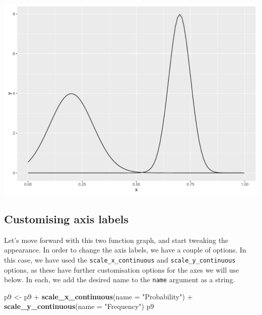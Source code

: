 \documentclass[]{article}
\newenvironment{Shaded}{\begin{snugshade}}{\end{snugshade}}
\newcommand{\KeywordTok}[1]{\textcolor[rgb]{0.13,0.29,0.53}{\textbf{{#1}}}}
\newcommand{\DataTypeTok}[1]{\textcolor[rgb]{0.13,0.29,0.53}{{#1}}}
\newcommand{\StringTok}[1]{\textcolor[rgb]{0.31,0.60,0.02}{{#1}}}
\newcommand{\NormalTok}[1]{{#1}}
\begin{document}
\begin{center}\includegraphics{0_all_posts_pdf/function_4-1} \end{center}

\subsection{Customising axis labels}\label{customising-axis-labels-2}

Let's move forward with this two function graph, and start tweaking the
appearance. In order to change the axis labels, we have a couple of
options. In this case, we have used the \texttt{scale\_x\_continuous}
and \texttt{scale\_y\_continuous} options, as these have further
customisation options for the axes we will use below. In each, we add
the desired name to the \texttt{name} argument as a string.

\begin{Shaded}
\begin{Highlighting}[]
\NormalTok{p9 <-}\StringTok{ }\NormalTok{p9 +}\StringTok{ }\KeywordTok{scale_x_continuous}\NormalTok{(}\DataTypeTok{name =} \StringTok{"Probability"}\NormalTok{) +}
\StringTok{      }\KeywordTok{scale_y_continuous}\NormalTok{(}\DataTypeTok{name =} \StringTok{"Frequency"}\NormalTok{)}
\NormalTok{p9}
\end{Highlighting}
\end{Shaded}
\end{document}
